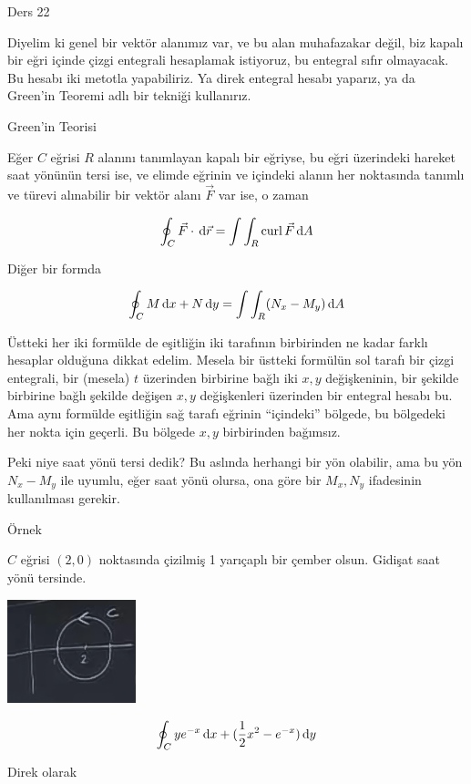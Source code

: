 \documentclass[12pt,fleqn]{article}\usepackage{../../common}
\begin{document}
Ders 22

Diyelim ki genel bir vektör alanımız var, ve bu alan muhafazakar değil, biz
kapalı bir eğri içinde çizgi entegrali hesaplamak istiyoruz, bu entegral
sıfır olmayacak. Bu hesabı iki metotla yapabiliriz. Ya direk entegral
hesabı yaparız, ya da Green'in Teoremi adlı bir tekniği kullanırız. 

Green'in Teorisi

Eğer $C$ eğrisi $R$ alanını tanımlayan kapalı bir eğriyse, bu eğri
üzerindeki hareket saat yönünün tersi ise, ve elimde eğrinin ve içindeki
alanın her noktasında tanımlı ve türevi alınabilir bir vektör alanı
$\vec{F}$ var ise, o zaman 

$$ \oint_C \vec{F} \cdot \,\mathrm{d}\vec{r} = \int \int_R \operatorname{curl} \vec{F} \,\mathrm{d} A $$

Diğer bir formda 

$$ \oint_C M \,\mathrm{d} x + N \,\mathrm{d} y = \int \int_R (N_x - M_y) \,\mathrm{d} A $$

Üstteki her iki formülde de eşitliğin iki tarafının birbirinden ne kadar
farklı hesaplar olduğuna dikkat edelim. Mesela bir üstteki formülün sol
tarafı bir çizgi entegrali, bir (mesela) $t$ üzerinden birbirine bağlı iki
$x,y$ değişkeninin, bir şekilde birbirine bağlı şekilde değişen $x,y$
değişkenleri üzerinden bir entegral hesabı bu. Ama aynı formülde eşitliğin
sağ tarafı eğrinin ``içindeki'' bölgede, bu bölgedeki her nokta için
geçerli. Bu bölgede $x,y$ birbirinden bağımsız. 

Peki niye saat yönü tersi dedik? Bu aslında herhangi bir yön olabilir, ama
bu yön $N_x-M_y$ ile uyumlu, eğer saat yönü olursa, ona göre bir $M_x,N_y$
ifadesinin kullanılması gerekir. 

Örnek

$C$ eğrisi $(2,0)$ noktasında çizilmiş 1 yarıçaplı bir çember
olsun. Gidişat saat yönü tersinde. 

\begin{center}
\includegraphics[height=3cm]{22_1.png}
\end{center}

$$ \oint_C ye^{-x} \,\mathrm{d} x + (\frac{1}{2}x^2 - e^{-x}) \,\mathrm{d} y $$

Direk olarak
\end{document}
